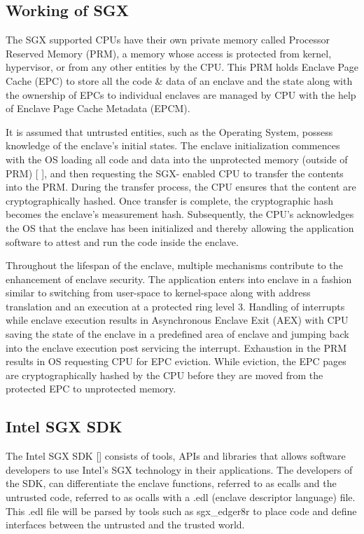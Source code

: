 \documentclass[article, doublespace,nopageskip]{VTthesis} %
\begin{document}
    \subsection{Working of SGX} \label{ss: Working of SGX}
    The SGX supported CPUs have their own private memory called Processor Reserved Memory (PRM), a memory whose access is protected from kernel, hypervisor, or from any other entities by the CPU. This PRM holds Enclave Page Cache (EPC) to store all the code \& data of an enclave and the state along with the ownership of EPCs to individual enclaves are managed by CPU with the help of Enclave Page Cache Metadata (EPCM). \ 

    It is assumed that untrusted entities, such as the Operating System, possess knowledge of the enclave's initial states. The enclave initialization commences with the OS loading all code and data into the unprotected memory (outside of PRM) [ ], and then requesting the SGX- enabled CPU to transfer the contents into the PRM. During the transfer process, the CPU ensures that the content are cryptographically hashed. Once transfer is complete, the cryptographic hash becomes the enclave's measurement hash. Subsequently, the CPU's acknowledges the OS that the enclave has been initialized and thereby allowing the application software to attest and run the code inside the enclave. \

    Throughout the lifespan of the enclave, multiple mechanisms contribute to the enhancement of enclave security. The application enters into enclave in a fashion similar to switching from user-space to kernel-space along with address translation and an execution at a protected ring level 3. Handling of interrupts while enclave execution results in Asynchronous Enclave Exit (AEX) with CPU saving the state of the enclave in a predefined area of enclave and jumping back into the enclave execution post servicing the interrupt. Exhaustion in the PRM results in OS requesting CPU for EPC eviction. While eviction, the EPC pages are cryptographically hashed by the CPU before they are moved from the protected EPC to unprotected memory.   

    \subsection{Intel SGX SDK} \label{ase:Intel SGX SDK}
    The Intel SGX SDK [] consists of tools, APIs and libraries that allows software developers to use Intel's SGX technology in their applications. The developers of the SDK, can differentiate the enclave functions, referred to as ecalls and the untrusted code, referred to as ocalls with a .edl (enclave descriptor language) file. This .edl file will be parsed by tools such as sgx\_edger8r to place code and define interfaces between the untrusted and the trusted world.
\end{document}
